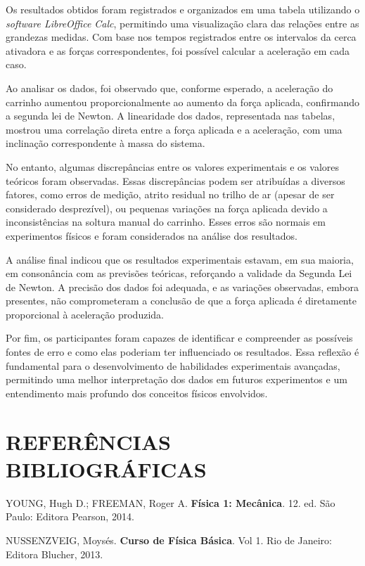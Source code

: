 \documentclass[article,12pt,oneside,a4paper,brazil]{abntex2}
\begin{document}
	Os resultados obtidos foram registrados e organizados em uma tabela utilizando o 
	\textit{software LibreOffice Calc}, permitindo uma visualização clara das relações entre as grandezas medidas. Com base nos tempos registrados entre os intervalos da cerca ativadora e as forças correspondentes, foi possível calcular a aceleração em cada caso.
	
	Ao analisar os dados, foi observado que, conforme esperado, a aceleração do carrinho
	aumentou proporcionalmente ao aumento da força aplicada, confirmando a segunda lei de Newton. A linearidade dos dados, representada nas tabelas, mostrou uma correlação direta entre a força aplicada e a aceleração, com uma inclinação correspondente à massa do sistema.
	
	No entanto, algumas discrepâncias entre os valores experimentais e os valores teóricos foram observadas. Essas discrepâncias podem ser atribuídas a diversos fatores, como erros de medição, atrito residual no trilho de ar (apesar de ser considerado desprezível), ou pequenas variações na força aplicada devido a inconsistências na soltura manual do carrinho. Esses erros são normais em experimentos físicos e foram considerados na análise dos resultados.
	
	A análise final indicou que os resultados experimentais estavam, em sua maioria, em
	consonância com as previsões teóricas, reforçando a validade da Segunda Lei de Newton. A precisão dos dados foi adequada, e as variações observadas, embora presentes, não comprometeram a conclusão de que a força aplicada é diretamente proporcional à aceleração produzida.
	
	Por fim, os participantes foram capazes de identificar e compreender as possíveis fontes de erro e como elas poderiam ter influenciado os resultados. Essa reflexão é fundamental para o desenvolvimento de habilidades experimentais avançadas, permitindo uma melhor interpretação dos dados em futuros experimentos e um entendimento mais profundo dos conceitos físicos envolvidos.
	
	\section{REFERÊNCIAS BIBLIOGRÁFICAS}
	
	YOUNG, Hugh D.; FREEMAN, Roger A. \textbf{Física 1: Mecânica}. 12. ed. São Paulo: Editora Pearson, 2014.
	
	NUSSENZVEIG, Moysés. \textbf{Curso de Física Básica}. Vol 1. Rio de Janeiro: Editora Blucher, 2013.
\end{document}
